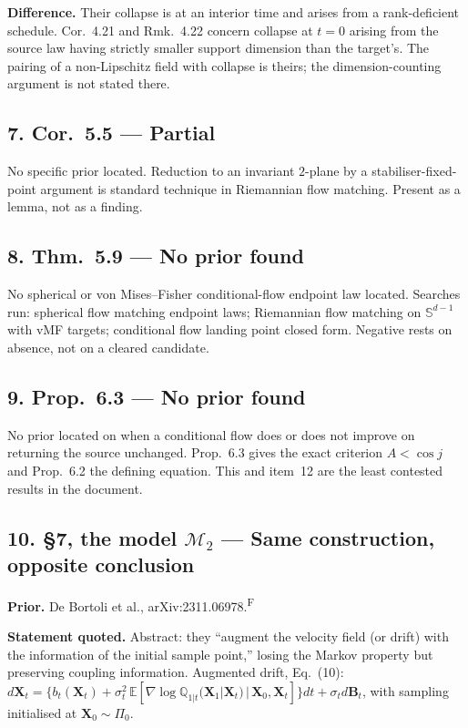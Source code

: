 \documentclass[11pt]{article}
\newcommand{\F}{\textsuperscript{F}}
\begin{document}
\textbf{Difference.} Their collapse is at an interior time and arises from a rank-deficient
schedule. Cor.~4.21 and Rmk.~4.22 concern collapse at $t=0$ arising from the source law having
strictly smaller support dimension than the target's. The pairing of a non-Lipschitz field with
collapse is theirs; the dimension-counting argument is not stated there.

\subsection*{7. Cor.~5.5 --- Partial}

No specific prior located. Reduction to an invariant $2$-plane by a stabiliser-fixed-point
argument is standard technique in Riemannian flow matching. Present as a lemma, not as a finding.

\subsection*{8. Thm.~5.9 --- No prior found}

No spherical or von Mises--Fisher conditional-flow endpoint law located. Searches run: spherical
flow matching endpoint laws; Riemannian flow matching on $\mathbb S^{d-1}$ with vMF targets;
conditional flow landing point closed form. Negative rests on absence, not on a cleared candidate.

\subsection*{9. Prop.~6.3 --- No prior found}

No prior located on when a conditional flow does or does not improve on returning the source
unchanged. Prop.~6.3 gives the exact criterion $A<\cos j$ and Prop.~6.2 the defining equation.
This and item~12 are the least contested results in the document.

\subsection*{10. \S7, the model $\mathcal M_2$ --- Same construction, opposite conclusion}

\textbf{Prior.} De Bortoli et al., arXiv:2311.06978.\F

\textbf{Statement quoted.} Abstract: they ``augment the velocity field (or drift) with the
information of the initial sample point,'' losing the Markov property but preserving coupling
information. Augmented drift, Eq.~(10):
$d\mathbf X_t=\{b_t(\mathbf X_t)+\sigma_t^2\,\mathbb E[\nabla\log
\mathbb Q_{1|t}(\mathbf X_1|\mathbf X_t)\,|\,\mathbf X_0,\mathbf X_t]\}dt+\sigma_t d\mathbf B_t$,
with sampling initialised at $\mathbf X_0\sim\Pi_0$.
\end{document}
